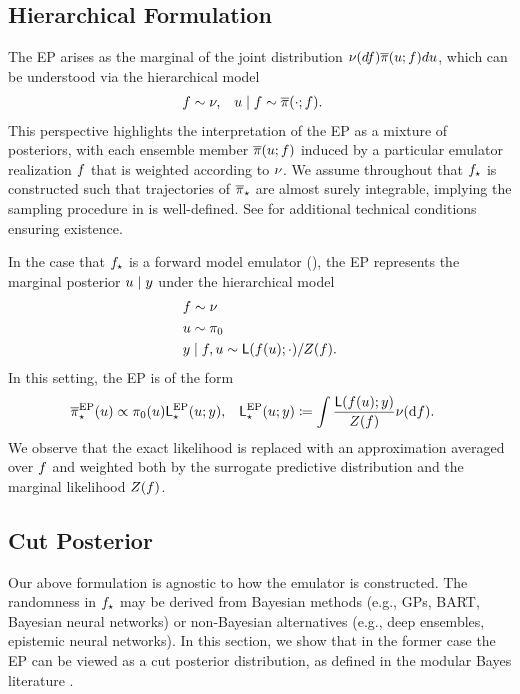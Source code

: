 \documentclass[12pt]{article}
\begin{document}
\subsection{Hierarchical Formulation}
The EP arises as the marginal of the 
joint distribution $\nu(df) \overline{\pi}(u; f) du$, which 
can be understood via the hierarchical model 
\begin{align}
&f  \sim \nu, 
&&u \mid f \sim \overline{\pi}(\cdot; f).
\label{eq:ep-prob-model}
\end{align}
This perspective highlights the interpretation of the EP as a mixture of posteriors,
with each ensemble member $\overline{\pi}(u; f)$ induced by 
a particular emulator realization $f$ that is weighted according to $\nu$.
We assume throughout that ${f}_{\star}$ is constructed such that 
trajectories of ${\overline{\pi}}_{\star}$ are almost surely integrable, implying the sampling procedure
in  is well-defined. See 
\citet{StuartTeck1,StuartTeck2,random_fwd_models,garegnani2021NoisyMCMC} for additional
technical conditions ensuring existence.

In the case that ${f}_{\star}$ is a forward model emulator (), the EP 
represents the marginal posterior $u \mid y$ under the hierarchical model 
\begin{align*}
&f  \sim \nu \\
&u \sim \pi_0 \\
&y \mid f, u \sim \mathsf{L}(f(u); \cdot)/Z(f).
\label{eq:ep-prob-model-fwd}
\end{align*}
In this setting, the EP is of the form 
\begin{align*}
&\postApproxEP(\Par) \propto \priorDens(\Par) \likApproxEP(\Par; \obs),
&&\likApproxEP(\Par; \obs) \Def \int \frac{\lik(\targetTraj(\Par); \obs)}{\normCst(\targetTraj)} \emDist(\d\targetTraj). 
\label{eq:lik-approx-EP}
\end{align*}
We observe that the exact likelihood is replaced with an approximation averaged over $f$ and 
weighted both by the surrogate predictive distribution and the marginal likelihood $Z(f)$.

\subsection{Cut Posterior} \label{sec:cut}
Our above formulation is agnostic to how the emulator is constructed. The 
randomness in ${f}_{\star}$ may be derived from Bayesian methods 
(e.g., GPs, BART, Bayesian neural networks) or non-Bayesian alternatives
(e.g., deep ensembles, epistemic neural networks). In this section, we show 
that in the former case the EP can be viewed as a cut posterior distribution,
as defined in the modular Bayes literature 
\citep{PlummerCut,cutInference,moduleModels,cutVar,cutVar2}.
\end{document}

